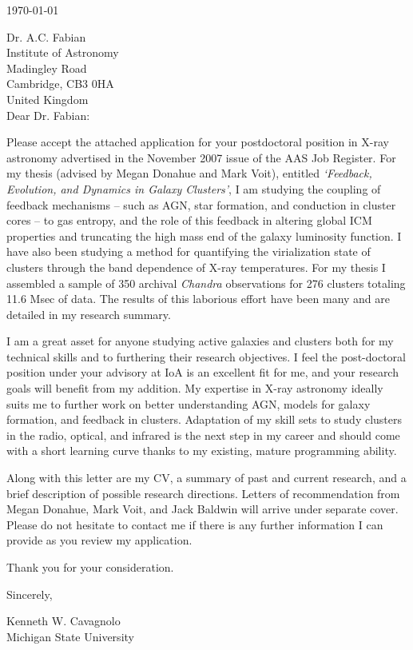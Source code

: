 \documentclass[11pt]{article}
\begin{document}
\today

Dr. A.C. Fabian\\
Institute of Astronomy\\
Madingley Road\\
Cambridge, CB3 0HA\\
United Kingdom\\

Dear Dr. Fabian:

Please accept the attached application for your postdoctoral
position in X-ray astronomy advertised in the November 2007 issue
of the AAS Job Register. For my thesis (advised by Megan Donahue and
Mark Voit), entitled {\textit{`Feedback,
Evolution, and Dynamics in Galaxy Clusters'}}, I am studying
the coupling of feedback mechanisms -- such as AGN, star formation, and
conduction in cluster cores -- to gas entropy, and the role
of this feedback in altering global ICM properties and truncating the
high mass end of the galaxy luminosity function. I have also been
studying a method for quantifying the virialization state of clusters
through the band dependence of X-ray temperatures. For my thesis I
assembled a sample of 350 archival {\textit{Chandra}} observations for
276 clusters totaling 11.6 Msec of data. The results of this laborious
effort have been many and are detailed in my research summary.

I am a great asset for anyone studying active galaxies and clusters
both for my technical skills and to furthering their research
objectives. I feel the post-doctoral position under your advisory at
IoA is an excellent fit for me, and your research goals will benefit
from my addition. My expertise in X-ray astronomy ideally suits me to
further work on better understanding AGN, models for galaxy formation,
and feedback in clusters. Adaptation of my skill sets to study
clusters in the radio, optical, and infrared is the next step in my
career and should come with a short learning curve thanks to my
existing, mature programming ability.

Along with this letter are my CV, a summary of past and
current research, and a brief description of possible research
directions. Letters of recommendation from Megan Donahue, Mark Voit,
and Jack Baldwin will arrive under separate cover. Please do not
hesitate to contact me if there is any further information I can
provide as you review my application.

Thank you for your consideration.

Sincerely,\\
\begin{minipage}{7.5in}
\end{minipage}
Kenneth W. Cavagnolo\\
Michigan State University
\end{document}
